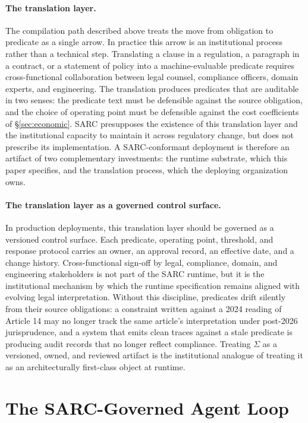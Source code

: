\documentclass[11pt,a4paper]{article}
\theoremstyle{remark}
\begin{document}
\paragraph{The translation layer.}\label{sec:translation} The compilation path described above treats the move from obligation to predicate as a single arrow. In practice this arrow is an institutional process rather than a technical step. Translating a clause in a regulation, a paragraph in a contract, or a statement of policy into a machine-evaluable predicate requires cross-functional collaboration between legal counsel, compliance officers, domain experts, and engineering. The translation produces predicates that are auditable in two senses: the predicate text must be defensible against the source obligation, and the choice of operating point must be defensible against the cost coefficients of \S\ref{sec:economic}. SARC presupposes the existence of this translation layer and the institutional capacity to maintain it across regulatory change, but does not prescribe its implementation. A SARC-conformant deployment is therefore an artifact of two complementary investments: the runtime substrate, which this paper specifies, and the translation process, which the deploying organization owns.

\paragraph{The translation layer as a governed control surface.} In production deployments, this translation layer should be governed as a versioned control surface. Each predicate, operating point, threshold, and response protocol carries an owner, an approval record, an effective date, and a change history. Cross-functional sign-off by legal, compliance, domain, and engineering stakeholders is not part of the SARC runtime, but it is the institutional mechanism by which the runtime specification remains aligned with evolving legal interpretation. Without this discipline, predicates drift silently from their source obligations: a constraint written against a 2024 reading of Article 14 may no longer track the same article's interpretation under post-2026 jurisprudence, and a system that emits clean traces against a stale predicate is producing audit records that no longer reflect compliance. Treating $\Sigma$ as a versioned, owned, and reviewed artifact is the institutional analogue of treating it as an architecturally first-class object at runtime.

\section{The SARC-Governed Agent Loop}\label{sec:loop}
\end{document}
